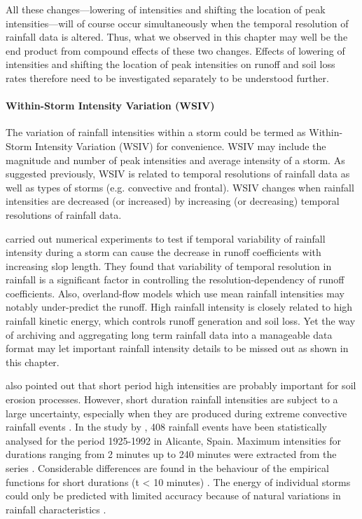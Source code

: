 All these changes---lowering of intensities and shifting the location of peak
intensities---will of course occur simultaneously when the temporal resolution
of rainfall data is altered. Thus, what we observed in this chapter may well be
the end product from compound effects of these two changes. Effects of lowering
of intensities and shifting the location of peak intensities on runoff and
soil loss rates therefore need to be investigated separately to be understood
further.

\paragraph{Within-Storm Intensity Variation (WSIV)} The variation of rainfall
intensities within a storm could be termed as Within-Storm Intensity Variation
(WSIV) for convenience. WSIV may include the magnitude and number of peak
intensities and average intensity of a storm. As suggested previously, WSIV is
related to temporal resolutions of rainfall data as well as types of storms
(e.g. convective and frontal). WSIV changes when rainfall intensities are
decreased (or increased) by increasing (or decreasing) temporal resolutions of
rainfall data.

\citet{wainwright2002-1271} carried out numerical experiments to test if
temporal variability of rainfall intensity during a storm can cause the decrease
in runoff coefficients with increasing slop length. They found that variability
of temporal resolution in rainfall is a significant factor in controlling the
resolution-dependency of runoff coefficients. Also, overland-flow models which
use mean rainfall intensities may notably under-predict the runoff.
High rainfall intensity is closely related to high rainfall kinetic energy,
which controls runoff generation and soil loss. Yet the way of archiving and
aggregating long term rainfall data into a manageable data format may let
important rainfall intensity details to be missed out as shown in this chapter.

\citet{boardman1987-36} also pointed out that short period high intensities
are probably important for soil erosion processes. However, short duration
rainfall intensities are subject to a large uncertainty, especially when they
are produced during extreme convective rainfall events \citep{garcia2001-675}.
In the study by \citet{garcia2001-675}, 408 rainfall events have been
statistically analysed for the period 1925-1992 in Alicante, Spain. Maximum
intensities for durations ranging from 2 minutes up to 240 minutes were
extracted from the series \citep{garcia2001-675}. Considerable differences are
found in the behaviour of the empirical functions for short durations (t < 10
minutes) \citep{garcia2001-675}. The energy of individual storms could only be
predicted with limited accuracy because of natural variations in rainfall
characteristics \citep{vandijk2002-1}.

